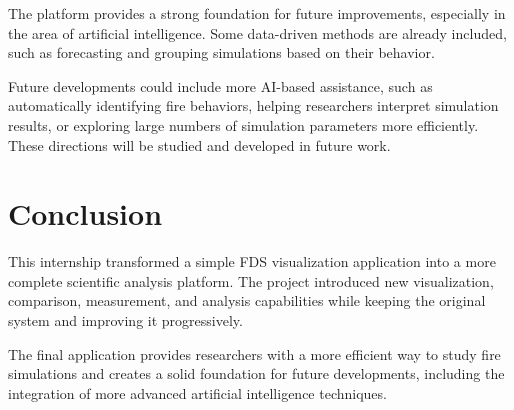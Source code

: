 \documentclass[11pt,a4paper]{article}
\begin{document}
The platform provides a strong foundation for future improvements, especially in the area
of artificial intelligence. Some data-driven methods are already included, such as
forecasting and grouping simulations based on their behavior.

Future developments could include more AI-based assistance, such as automatically
identifying fire behaviors, helping researchers interpret simulation results, or exploring
large numbers of simulation parameters more efficiently. These directions will be studied
and developed in future work.

\section{Conclusion}

This internship transformed a simple FDS visualization application into a more complete
scientific analysis platform. The project introduced new visualization, comparison,
measurement, and analysis capabilities while keeping the original system and improving it
progressively.

The final application provides researchers with a more efficient way to study fire
simulations and creates a solid foundation for future developments, including the
integration of more advanced artificial intelligence techniques.
\end{document}
